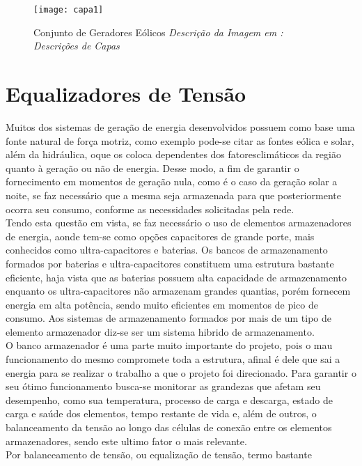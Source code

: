 \documentclass[11pt, a4paper, oneside]{article}
\begin{document}
\newpage 


 	\newpage
	\thispagestyle{empty}
	\clearpage
	\begin{figure}
		\centering
		\texttt{[image: capa1]}
		\label{fig:adc_dac_ideal}
		\caption{Conjunto de Geradores Eólicos \textit{Descrição da Imagem em : Descrições de Capas}}
	\end{figure}
	\clearpage
	\newpage
	
\section{Equalizadores de Tensão}
Muitos dos sistemas de geração de energia desenvolvidos possuem como
base uma fonte natural de força motriz, como exemplo pode-se citar as fontes
eólica e solar, além da hidráulica, oque os coloca dependentes dos fatoresclimáticos da região quanto à geração ou não de energia. Desse modo, a fim de
garantir o fornecimento em momentos de geração nula, como é o caso da geração
solar a noite, se faz necessário que a mesma seja armazenada para que
posteriormente ocorra seu consumo, conforme as necessidades solicitadas pela
rede.\\
Tendo esta questão em vista, se faz necessário o uso de elementos
armazenadores de energia, aonde tem-se como opções capacitores de grande
porte, mais conhecidos como ultra-capacitores e baterias. Os bancos de
armazenamento formados por baterias e ultra-capacitores constituem uma
estrutura bastante eficiente, haja vista que as baterias possuem alta capacidade de
armazenamento enquanto os ultra-capacitores não armazenam grandes quantias,
porém fornecem energia em alta potência, sendo muito eficientes em momentos de
pico de consumo. Aos sistemas de armazenamento formados por mais de um tipo
de elemento armazenador diz-se ser um sistema hibrido de armazenamento.\\
O banco armazenador é uma parte muito importante do projeto, pois o mau
funcionamento do mesmo compromete toda a estrutura, afinal é dele que sai a
energia para se realizar o trabalho a que o projeto foi direcionado. Para garantir o
seu ótimo funcionamento busca-se monitorar as grandezas que afetam seu
desempenho, como sua temperatura, processo de carga e descarga, estado de carga
e saúde dos elementos, tempo restante de vida e, além de outros, o balanceamento
da tensão ao longo das células de conexão entre os elementos armazenadores,
sendo este ultimo fator o mais relevante.\\
Por balanceamento de tensão, ou equalização de tensão, termo bastante
\end{document}
